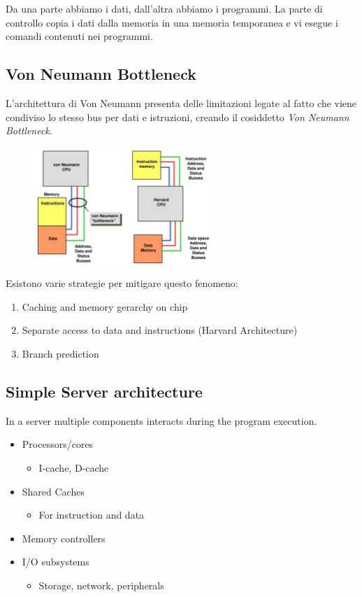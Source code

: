 Da una parte abbiamo i dati, dall'altra abbiamo i programmi. La parte di controllo copia i dati dalla memoria in una memoria temporanea e vi esegue i comandi contenuti nei programmi.\\

\subsection{Von Neumann Bottleneck}
L'architettura di Von Neumann presenta delle limitazioni legate al fatto che viene condiviso lo stesso bus per dati e istruzioni, creando il cosiddetto \textit{Von Neumann Bottleneck}.\\



\begin{figure}[ht]
    \centering
    \includegraphics[width=0.6\textwidth]{figure_parallel/bottleneck.png}
\end{figure}
\FloatBarrier


Esistono varie strategie per mitigare questo fenomeno:
\begin{enumerate}
    \item Caching and memory gerarchy on chip
    \item Separate access to data and instructions (Harvard Architecture)
    \item Branch prediction
\end{enumerate}

\subsection{Simple Server architecture}
In a server multiple components interacts during the program execution.
\begin{itemize}
    \item Processors/cores
    \begin{itemize}
        \item I-cache, D-cache
    \end{itemize}
    \item Shared Caches
    \begin{itemize}
        \item For instruction and data
    \end{itemize}
    \item Memory controllers
    \item I/O subsystems
        \begin{itemize}
        \item Storage, network, peripherals
    \end{itemize}
\end{itemize}

